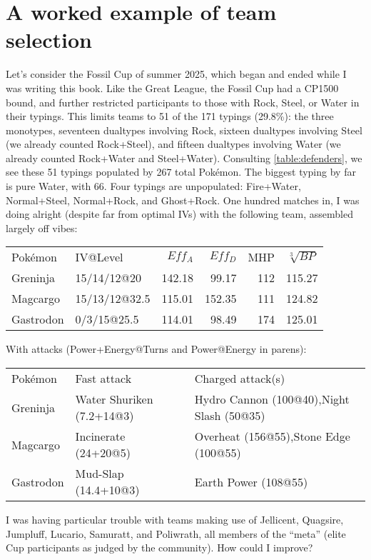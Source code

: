 \chapter{A worked example of team selection\label{chap:example}}

Let's consider the Fossil Cup of summer 2025, which began and ended while I was writing this book.
Like the Great League, the Fossil Cup had a CP1500 bound, and further
  restricted participants to those with Rock, Steel, or Water in their typings.
This limits teams to 51 of the 171 typings (29.8\%): the three monotypes, seventeen dualtypes
 involving Rock, sixteen dualtypes involving Steel (we already counted Rock+Steel), and
 fifteen dualtypes involving Water (we already counted Rock+Water and Steel+Water).
Consulting \autoref{table:defenders}, we see these 51 typings populated by 267 total Pokémon.
The biggest typing by far is pure Water, with 66.
Four typings are unpopulated: Fire+Water, Normal+Steel, Normal+Rock, and Ghost+Rock.
One hundred matches in, I was doing alright (despite far from optimal IVs)
  with the following team, assembled largely off vibes:
\begin{center}
  \begin{tabular}{llrrrr}
    Pokémon & IV@Level & $Eff_A$ & $Eff_D$ & MHP & $\sqrt[3]{BP}$\\
    \Midrule
    Greninja & 15/14/12@20 & 142.18 & 99.17 & 112 & 115.27 \\
    Magcargo & 15/13/12@32.5 & 115.01 & 152.35 & 111 & 124.82 \\
    Gastrodon & 0/3/15@25.5 & 114.01 & 98.49 & 174 & 125.01 \\
  \end{tabular}
\end{center}
With attacks (Power+Energy@Turns and Power@Energy in parens):
\begin{center}
  \begin{tabular}{llp{}}
    Pokémon & Fast attack & Charged attack(s)\\
    \Midrule
    Greninja & Water Shuriken (7.2+14@3) & Hydro Cannon (100@40),\newline Night Slash (50@35)\\
    Magcargo & Incinerate (24+20@5) & Overheat (156@55),\newline Stone Edge (100@55)\\
    Gastrodon & Mud-Slap (14.4+10@3) & Earth Power (108@55)\\
  \end{tabular}
\end{center}
I was having particular trouble with teams making use of Jellicent, Quagsire,
  Jumpluff, Lucario, Samuratt, and Poliwrath, all members of the ``meta'' (elite Cup participants
  as judged by the community).
How could I improve?

